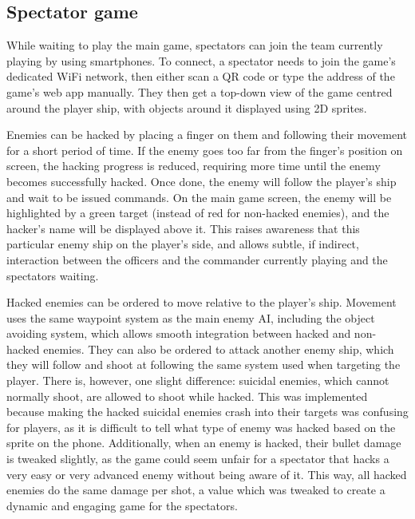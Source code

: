 \documentclass[a4paper,11pt]{article}
\begin{document}
\subsection{Spectator game}
While waiting to play the main game, spectators can join the team currently playing by using smartphones. To connect, a spectator needs to join the game’s dedicated WiFi network, then either scan a QR code or type the address of the game’s web app manually. They then get a top-down view of the game centred around the player ship, with objects around it displayed using 2D sprites.

Enemies can be hacked by placing a finger on them and following their movement for a short period of time. If the enemy goes too far from the finger’s position on screen, the hacking progress is reduced, requiring more time until the enemy becomes successfully hacked. Once done, the enemy will follow the player’s ship and wait to be issued commands. On the main game screen, the enemy will be highlighted by a green target (instead of red for non-hacked enemies), and the hacker’s name will be displayed above it. This raises awareness that this particular enemy ship on the player’s side, and allows subtle, if indirect, interaction between the officers and the commander currently playing and the spectators waiting.

Hacked enemies can be ordered to move relative to the player’s ship. Movement uses the same waypoint system as the main enemy AI, including the object avoiding system, which allows smooth integration between hacked and non-hacked enemies. They can also be ordered to attack another enemy ship, which they will follow and shoot at following the same system used when targeting the player. There is, however, one slight difference: suicidal enemies, which cannot normally shoot, are allowed to shoot while hacked. This was implemented because making the hacked suicidal enemies crash into their targets was confusing for players, as it is difficult to tell what type of enemy was hacked based on the sprite on the phone. Additionally, when an enemy is hacked, their bullet damage is tweaked slightly, as the game could seem unfair for a spectator that hacks a very easy or very advanced enemy without being aware of it. This way, all hacked enemies do the same damage per shot, a value which was tweaked to create a dynamic and engaging game for the spectators.
\end{document}
